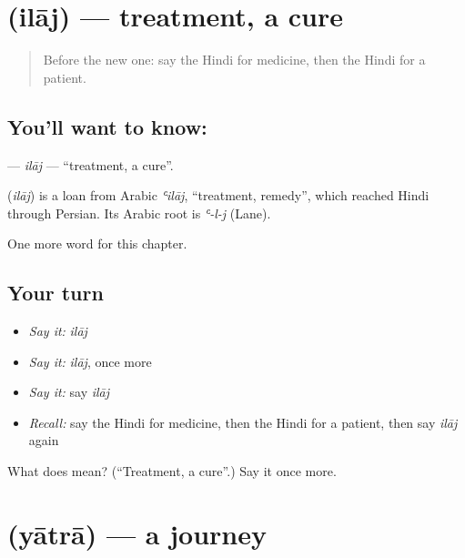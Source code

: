 \section[\texorpdfstring{\hi{इलाज} (ilāj)}{इलाज (ilāj)}]{ (ilāj) — treatment, a cure}

\label{lesson:HI-C180-ilaj}



\begin{quote}
Before the new one: say the Hindi for medicine, then the Hindi for a patient.
\end{quote}

\subsection*{You'll want to know: }
\textbf{} — \emph{ilāj} — \textquotedblleft{}treatment, a cure\textquotedblright{}.

\begin{cousinweb}
\textbf{} (\emph{ilāj}) is a loan from Arabic \emph{ʿilāj}, \textquotedblleft{}treatment, remedy\textquotedblright{}, which reached Hindi through Persian. Its Arabic root is \emph{ʿ-l-j} (Lane).
\end{cousinweb}

\begin{grammarlens}[title={What you've built}]
One more word for this chapter.
\end{grammarlens}

\subsection*{Your turn}
\begin{itemize}
\raggedright
  \item \emph{Say it:} \emph{ilāj}
  \item \emph{Say it:} \emph{ilāj}, once more
  \item \emph{Say it:} say \emph{ilāj}
  \item \emph{Recall:} say the Hindi for medicine, then the Hindi for a patient, then say \emph{ilāj} again
\end{itemize}

\begin{tcolorbox}[breakable,colback=teal!4,colframe=teal!35!black,title={Before you move on}]
What does  mean? (\textquotedblleft{}Treatment, a cure\textquotedblright{}.) Say it once more.
\end{tcolorbox}
\section[\texorpdfstring{\hi{यात्रा} (yātrā)}{यात्रा (yātrā)}]{ (yātrā) — a journey}


